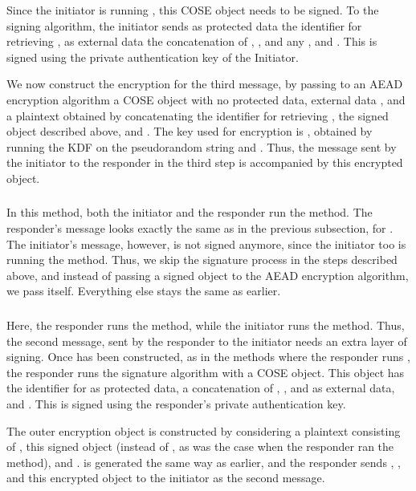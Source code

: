 Since the initiator is running \mSig, this COSE object needs to be signed. To the signing algorithm, the initiator sends as protected data the identifier for retrieving \mCredi, as external data the concatenation of \mTHthree, \mCredi, and any \mADthree, and \mMacthree. This is signed using the private authentication key of the Initiator.  

We now construct the encryption for the third message, by passing to an AEAD encryption algorithm a COSE object with no protected data, external data \mTHthree, and a plaintext obtained by concatenating the identifier for retrieving \mCredi, the signed object described above, and \mADthree. The key used for encryption is \mKthree, obtained by running the KDF on the pseudorandom string \mPRKthree and \mTHthree. Thus, the message sent by the initiator to the responder in the third step is \mCr accompanied by this encrypted object.

\subsubsection{\mStatStat}
In this method, both the initiator and the responder run the \mStat method. The responder's message looks exactly the same as in the previous subsection, for \mSigStat. The initiator's message, however, is not signed anymore, since the initiator too is running the \mStat method. Thus, we skip the signature process in the steps described above, and instead of passing a signed object to the AEAD encryption algorithm, we pass \mMacthree itself. Everything else stays the same as earlier.

\subsubsection{\mStatSig}
Here, the responder runs the \mSig method, while the initiator runs the \mStat method. Thus, the second message, sent by the responder to the initiator needs an extra layer of signing. Once \mMactwo has been constructed, as in the methods where the responder runs \mStat, the responder runs the signature algorithm with a COSE object. This object has the identifier for \mCredr as protected data, a concatenation of \mTHtwo, \mCredr, and \mADtwo as external data, and \mMactwo. This is signed using the responder's private authentication key.

The outer encryption object is constructed by considering a plaintext consisting of \mCredr, this signed object (instead of \mMactwo, as was the case when the responder ran the \mStat method), and \mADtwo. \mKtwo is generated the same way as earlier, and the responder sends \mGy, \mCr, and this encrypted object to the initiator as the second message.

